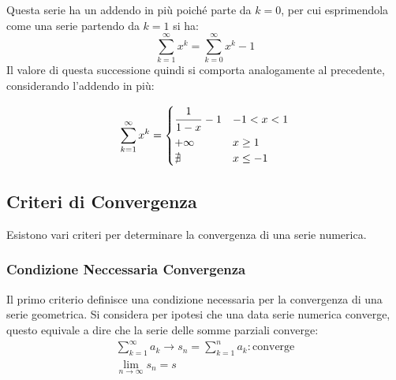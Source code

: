 \documentclass{article}
\numberwithin{equation}{subsection}
\begin{document}
Questa serie ha un addendo in più poiché parte da $k=0$, per cui esprimendola come una serie partendo da $k=1$ si ha:
\begin{equation*}
    \displaystyle\sum_{k=1}^\infty x^k=\displaystyle\sum_{k=0}^\infty x^k-1
\end{equation*}
Il valore di questa successione quindi si comporta analogamente al precedente, considerando l'addendo in più:

\begin{equation}
    \displaystyle\sum_{k=1}^\infty x^k=\begin{cases}
        \displaystyle\frac{\strut 1}{\strut 1-x}-1 &-1<x<1\\
        +\infty & x\geq1\\
        \nexists & x\leq-1
    \end{cases}
\end{equation}

\subsection{Criteri di Convergenza}

Esistono vari criteri per determinare la convergenza di una serie numerica. 

\subsubsection{Condizione Neccessaria Convergenza}

Il primo criterio definisce una condizione necessaria per la convergenza di una serie geometrica. 
Si considera per ipotesi che una data serie numerica converge, questo equivale a dire che la serie delle somme parziali converge:
\begin{gather*}
    \displaystyle\sum_{k=1}^\infty a_k\rightarrow s_n=\sum_{k=1}^n a_k:\mbox{converge}\\
    \lim_{n\to\infty}s_n=s
\end{gather*}
\end{document}
